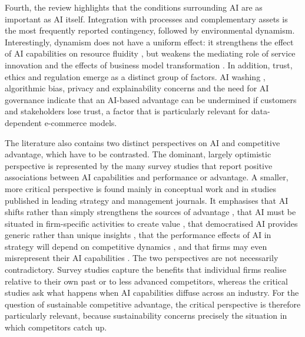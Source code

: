 Fourth, the review highlights that the conditions surrounding AI are as important as AI itself. Integration with processes and complementary assets is the most frequently reported contingency, followed by environmental dynamism. Interestingly, dynamism does not have a uniform effect: it strengthens the effect of AI capabilities on resource fluidity \parencite[3003]{slrR056}, but weakens the mediating role of service innovation \parencite[10]{li2025} and the effects of business model transformation \parencite[1]{slrR037}. In addition, trust, ethics and regulation emerge as a distinct group of factors. AI washing \parencite[519]{slrR148}, algorithmic bias, privacy and explainability concerns \parencite[1]{slrR133} and the need for AI governance \parencites[1]{slrR001}[2227]{slrR043} indicate that an AI-based advantage can be undermined if customers and stakeholders lose trust, a factor that is particularly relevant for data-dependent e-commerce models.

The literature also contains two distinct perspectives on AI and competitive advantage, which have to be contrasted. The dominant, largely optimistic perspective is represented by the many survey studies that report positive associations between AI capabilities and performance or advantage. A smaller, more critical perspective is found mainly in conceptual work and in studies published in leading strategy and management journals. It emphasises that AI shifts rather than simply strengthens the sources of advantage \parencite[1425]{krakowski2023}, that AI must be situated in firm-specific activities to create value \parencite[618]{slrR087}, that democratised AI provides generic rather than unique insights \parencite[583]{cui2024}, that the performance effects of AI in strategy will depend on competitive dynamics \parencite[322]{slrR129}, and that firms may even misrepresent their AI capabilities \parencite[519]{slrR148}. The two perspectives are not necessarily contradictory. Survey studies capture the benefits that individual firms realise relative to their own past or to less advanced competitors, whereas the critical studies ask what happens when AI capabilities diffuse across an industry. For the question of sustainable competitive advantage, the critical perspective is therefore particularly relevant, because sustainability concerns precisely the situation in which competitors catch up.

